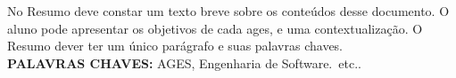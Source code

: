 \begin{resumo}
  No Resumo deve constar um texto breve sobre os conteúdos desse documento. O
  aluno pode apresentar os objetivos de cada ages, e uma contextualização. O
  Resumo dever ter um único parágrafo e suas palavras chaves.
  \bigbreak\
  \\\textbf{PALAVRAS CHAVES:}
  AGES, Engenharia de Software.\ etc..
\end{resumo}